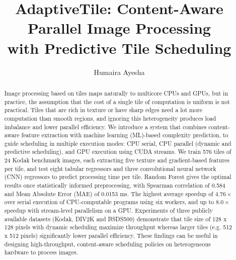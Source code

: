 \documentclass[acmsmall]{acmart}
\begin{document}
\title{AdaptiveTile: Content-Aware Parallel Image Processing\\with Predictive Tile Scheduling}

\author{Humaira Ayesha}

\renewcommand{\shortauthors}{Ayesha}


\begin{abstract}
Image processing based on tiles maps naturally to multicore CPUs and GPUs, but in practice, the assumption that the cost of a single tile of computation is uniform is not practical. 
Tiles that are rich in texture or have sharp edges need a lot more computation than smooth regions, and ignoring this heterogeneity produces load imbalance and lower parallel efficiency. We introduce a system that combines content-aware feature extraction with machine learning (ML)-based complexity prediction, to guide scheduling in multiple execution modes: CPU serial, CPU parallel (dynamic and predictive scheduling), and GPU execution using CUDA streams. We train 576 tiles of 24 Kodak benchmark images, each extracting five texture and gradient-based features per tile, and test eight tabular regressors and three convolutional neural network (CNN) regressors to predict processing time per tile. Random Forest gives the optimal results once statistically informed preprocessing, with Spearman correlation of 0.584 and Mean Absolute Error (MAE) of 0.0153 ms. The highest average speedup of $4.76\times$ over serial execution of CPU-computable programs using six workers, and up to $8.0\times$ speedup with stream-level parallelism on a GPU. Experiments of three publicly available datasets (Kodak, DIV2K and BSDS500) demonstrate that tile size of 128 x 128 pixels with dynamic scheduling maximize throughput whereas larger tiles (e.g. 512 x 512 pixels) significantly lower parallel efficiency. These findings can be useful in designing high-throughput, content-aware scheduling policies on heterogeneous hardware to process images.
\end{abstract}
\end{document}
